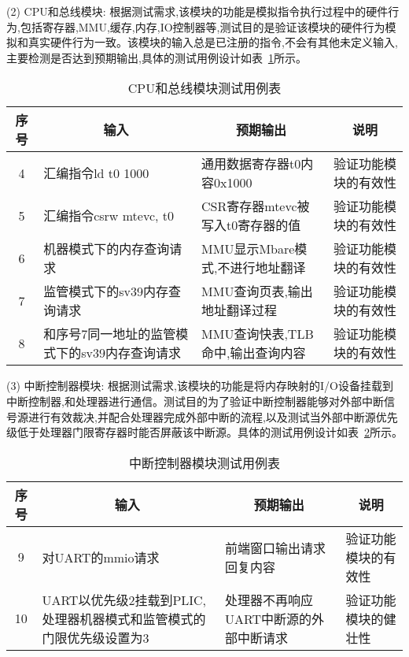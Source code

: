 (2) CPU和总线模块: 根据测试需求,该模块的功能是模拟指令执行过程中的硬件行为,包括寄存器,MMU,缓存,内存,IO控制器等,测试目的是验证该模块的硬件行为模拟和真实硬件行为一致。该模块的输入总是已注册的指令,不会有其他未定义输入,主要检测是否达到预期输出,具体的测试用例设计如表~\ref{tab:test2}所示。
\begin{table}[h]
    \centering
    \caption{CPU和总线模块测试用例表}
    \label{tab:test2}
    \renewcommand\arraystretch{1.2}
    \begin{tabular}{clll}
      \toprule
      \multicolumn{1}{c}{序号} & \multicolumn{1}{c}{输入} & \multicolumn{1}{c}{预期输出} &\multicolumn{1}{c}{说明}\\
      \midrule
  4	& \multicolumn{1}{m{3.5cm}}{汇编指令ld t0 1000} & \multicolumn{1}{m{3.5cm}}{通用数据寄存器t0内容0x1000} & \multicolumn{1}{m{3.5cm}}{验证功能模块的有效性}\\
  \hline
  5	& \multicolumn{1}{m{3.5cm}}{汇编指令csrw mtevc, t0} & \multicolumn{1}{m{3.5cm}}{CSR寄存器mtevc被写入t0寄存器的值} & \multicolumn{1}{m{3.5cm}}{验证功能模块的有效性}\\
  \hline
  6	& \multicolumn{1}{m{3.5cm}}{机器模式下的内存查询请求} & \multicolumn{1}{m{3.5cm}}{MMU显示Mbare模式,不进行地址翻译} & \multicolumn{1}{m{3.5cm}}{验证功能模块的有效性}\\
  \hline
  7	& \multicolumn{1}{m{3.5cm}}{监管模式下的sv39内存查询请求} & \multicolumn{1}{m{3.5cm}}{MMU查询页表,输出地址翻译过程} & \multicolumn{1}{m{3.5cm}}{验证功能模块的有效性}\\
  \hline
  8	& \multicolumn{1}{m{3.5cm}}{和序号7同一地址的监管模式下的sv39内存查询请求} & \multicolumn{1}{m{3.5cm}}{MMU查询快表,TLB命中,输出查询内容} & \multicolumn{1}{m{3.5cm}}{验证功能模块的有效性}\\
      \bottomrule
    \end{tabular}
\end{table}

(3) 中断控制器模块: 根据测试需求,该模块的功能是将内存映射的I/O设备挂载到中断控制器,和处理器进行通信。测试目的为了验证中断控制器能够对外部中断信号源进行有效裁决,并配合处理器完成外部中断的流程,以及测试当外部中断源优先级低于处理器门限寄存器时能否屏蔽该中断源。具体的测试用例设计如表~\ref{tab:test3}所示。
\begin{table}[h]
    \centering
    \caption{中断控制器模块测试用例表}
    \label{tab:test3}
    \renewcommand\arraystretch{1.2}
    \begin{tabular}{clll}
      \toprule
      \multicolumn{1}{c}{序号} & \multicolumn{1}{c}{输入} & \multicolumn{1}{c}{预期输出} &\multicolumn{1}{c}{说明}\\
      \midrule
  9	& \multicolumn{1}{m{3.5cm}}{对UART的mmio请求} & \multicolumn{1}{m{3.5cm}}{前端窗口输出请求回复内容} & \multicolumn{1}{m{3.5cm}}{验证功能模块的有效性}\\
  \hline
  10	& \multicolumn{1}{m{3.5cm}}{UART以优先级2挂载到PLIC,处理器机器模式和监管模式的门限优先级设置为3} & \multicolumn{1}{m{3.5cm}}{处理器不再响应UART中断源的外部中断请求} & \multicolumn{1}{m{3.5cm}}{验证功能模块的健壮性}\\
  \bottomrule
    \end{tabular}
\end{table}


